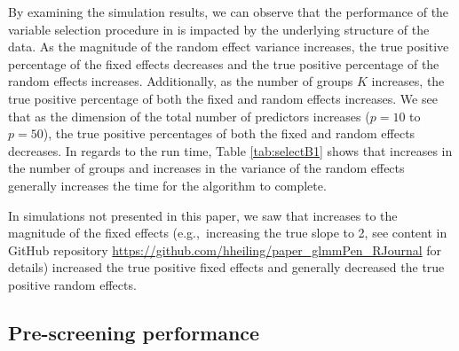 By examining the simulation results, we can observe that the performance of the variable selection procedure in  is impacted by the underlying structure of the data. As the magnitude of the random effect variance increases, the true positive percentage of the fixed effects decreases and the true positive percentage of the random effects increases. Additionally, as the number of groups \(K\) increases, the true positive percentage of both the fixed and random effects increases. We see that as the dimension of the total number of predictors increases ($p=10$ to $p=50$), the true positive percentages of both the fixed and random effects decreases.
In regards to the run time, Table \ref{tab:selectB1} shows that increases in the number of groups and increases in the variance of the random effects generally increases the time for the algorithm to complete.

In simulations not presented in this paper, we saw that increases to the magnitude of the fixed effects (e.g.,~increasing the true slope to 2, see content in GitHub repository \url{https://github.com/hheiling/paper_glmmPen_RJournal} for details) increased the true positive fixed effects and generally decreased the true positive random effects.


\subsection{Pre-screening performance}
\label{sec:pre-screening}

